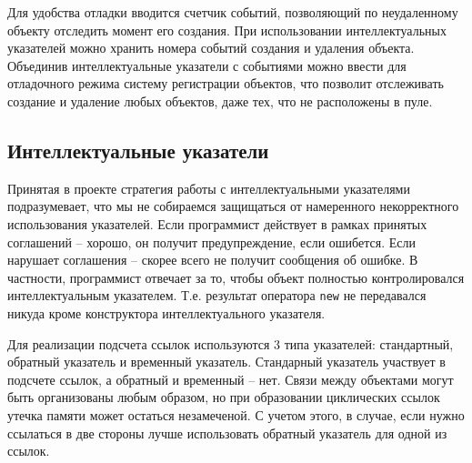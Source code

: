 \documentclass{article}
\begin{document}
Для удобства отладки вводится счетчик событий, позволяющий по неудаленному объекту отследить момент его создания. При использовании интеллектуальных указателей можно хранить номера событий создания и удаления объекта. Объединив интеллектуальные указатели с событиями можно ввести для отладочного режима систему регистрации объектов, что позволит отслеживать создание и удаление любых объектов, даже тех, что не расположены в пуле.

\subsection{Интеллектуальные указатели}
Принятая в проекте стратегия работы с интеллектуальными указателями подразумевает, что мы не собираемся защищаться от намеренного некорректного использования указателей. Если программист действует в рамках принятых соглашений -- хорошо, он получит предупреждение, если ошибется. Если нарушает соглашения -- скорее всего не получит сообщения об ошибке. В частности, программист отвечает за то, чтобы объект полностью контролировался интеллектуальным указателем. Т.е. результат оператора \lstinline{new} не передавался никуда кроме конструктора интеллектуального указателя.

Для реализации подсчета ссылок используются 3 типа указателей: стандартный, обратный указатель и временный указатель. Стандарный указатель участвует в подсчете ссылок, а обратный и временный -- нет. Связи между объектами могут быть организованы любым образом, но при образовании циклических ссылок утечка памяти может остаться незамеченой. С учетом этого, в случае, если нужно ссылаться в две стороны лучше использовать обратный указатель для одной из ссылок.
\end{document}
